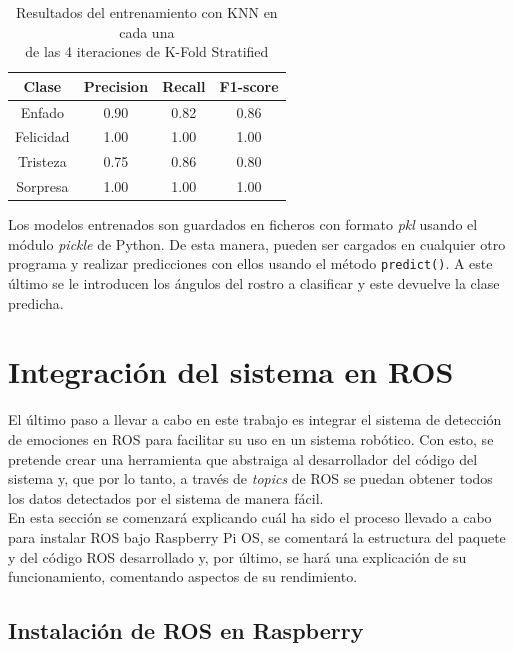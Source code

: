 \begin{table}[h]
\begin{minipage}{0.48\linewidth}
\begin{adjustbox}{max width=\textwidth}
\begin{tabular}{|c|c|c|c|}
\hline
\textbf{Clase} & \textbf{Precision} & \textbf{Recall} & \textbf{F1-score}\\
\hline
     Enfado & 0.90 & 0.82 & 0.86\\
     Felicidad & 1.00 & 1.00 & 1.00\\
     Tristeza & 0.75 & 0.86 & 0.80\\
     Sorpresa & 1.00 & 1.00 & 1.00\\
\hline
\end{tabular}
\end{adjustbox}
\end{minipage}
\captionsetup{justification=centering}
\caption{Resultados del entrenamiento con KNN en cada una\\
de las 4 iteraciones de K-Fold Stratified}
\label{cuadro:resultados_KNN_emociones}
\end{table}

Los modelos entrenados son guardados en ficheros con formato \textit{pkl} usando el módulo \textit{pickle} de Python. De esta manera, pueden ser cargados en cualquier otro programa y realizar predicciones con ellos usando el método \verb|predict()|. A este último se le introducen los ángulos del rostro a clasificar y este devuelve la clase predicha.\\

\section{Integración del sistema en ROS}
\label{sec:integración_en_ros}

El último paso a llevar a cabo en este trabajo es integrar el sistema de detección de emociones en ROS para facilitar su uso en un sistema robótico. Con esto, se pretende crear una herramienta que abstraiga al desarrollador del código del sistema y, que por lo tanto, a través de \textit{topics} de ROS se puedan obtener todos los datos detectados por el sistema de manera fácil.\\

En esta sección se comenzará explicando cuál ha sido el proceso llevado a cabo para instalar ROS bajo Raspberry Pi OS, se comentará la estructura del paquete y del código ROS desarrollado y, por último, se hará una explicación de su funcionamiento, comentando aspectos de su rendimiento.

\subsection{Instalación de ROS en Raspberry}

